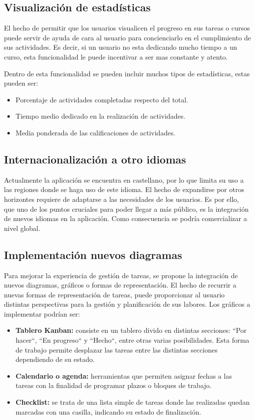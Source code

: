 \subsection{Visualización de estadísticas}
El hecho de permitir que los usuarios visualicen el progreso en sus tareas o cursos puede servir de ayuda de cara al usuario para concienciarlo en el cumplimiento de sus actividades. Es decir, si un usuario no esta dedicando mucho tiempo a un curso, esta funcionalidad le puede incentivar a ser mas constante y atento. 

Dentro de esta funcionalidad se pueden incluir muchos tipos de estadísticas, estas pueden ser:
\begin{itemize}
    \item Porcentaje de actividades completadas respecto del total.
    \item Tiempo medio dedicado en la realización de actividades.
    \item Media ponderada de las calificaciones de actividades.
\end{itemize}

\subsection{Internacionalización a otro idiomas}
Actualmente la aplicación se encuentra en castellano, por lo que limita su uso a las regiones donde se haga uso de este idioma. El hecho de expandirse por otros horizontes requiere de adaptarse a las necesidades de los usuarios. Es por ello, que uno de los puntos cruciales para poder llegar a más público, es la integración de nuevos idiomas en la aplicación. Como consecuencia se podría comercializar a nivel global.

\subsection{Implementación nuevos diagramas}
Para mejorar la experiencia de gestión de tareas, se propone la integración de nuevos diagramas, gráficos o formas de representación. El hecho de recurrir a nuevas formas de representación de tareas, puede proporcionar al usuario distintas perspectivas para la gestión y planificación de sus labores. Los gráficos a implementar podrían ser:
\begin{itemize}
    \item \textbf{Tablero Kanban:} consiste en un tablero divido en distintas secciones: ``Por hacer``, ``En progreso`` y ``Hecho``, entre otras varias posibilidades. Esta forma de trabajo permite desplazar las tareas entre las distintas secciones dependiendo de su estado.
    \item \textbf{Calendario o agenda:} herramientas que permiten asignar fechas a las tareas con la finalidad de programar plazos o bloques de trabajo.
    \item \textbf{Checklist:} se trata de una lista simple de tareas donde las realizadas quedan marcadas con una casilla, indicando su estado de finalización.
\end{itemize}

